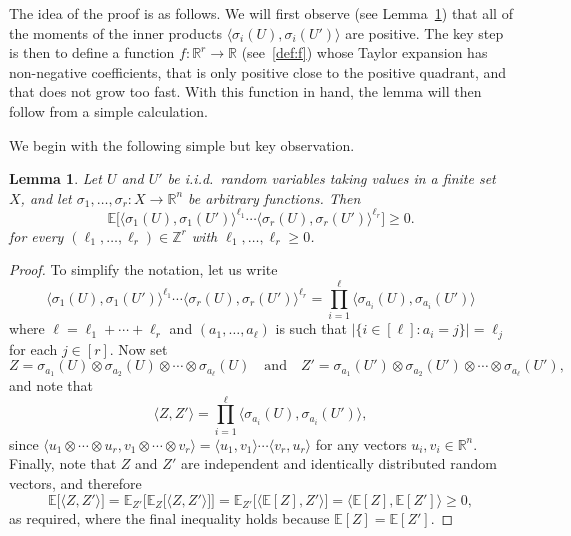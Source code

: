 \documentclass[12pt,reqno]{amsart}
\newtheorem{lemma}[theorem]{Lemma}
\theoremstyle{definition}
\theoremstyle{remark}
\newcommand\R{\mathbb{R}}
\newcommand\Z{\mathbb{Z}}
\newcommand\Ex{\mathbb{E}}
\renewcommand{\ge}{\geqslant}
\renewcommand{\to}{\rightarrow}
\def\R{\mathbb{R}}
\def\Z{\mathbb{Z}}
\begin{document}
The idea of the proof is as follows. We will first observe (see Lemma~\ref{lem:moments}) that all of the moments of the inner products \(\langle \sigma_i(U),\sigma_i(U') \rangle\) are positive. The key step is then to define a function \(f \colon \R^r \to \R\) (see~\eqref{def:f}) whose Taylor expansion has non-negative coefficients, that is only positive close to the positive quadrant, and that does not grow too fast. With this function in hand, the lemma will then follow from a simple calculation.

We begin with the following simple but key observation.

%
\begin{lemma}
	\label{lem:moments}
	Let \(U\) and\/ \(U'\) be i.i.d.~random variables taking values in a finite set~\(X\), and let\/ \(\sigma_1,\ldots,\sigma_r \colon X \to \R^n\) be arbitrary functions. Then
	\begin{equation*}
		\Ex\Big[ \big\langle \sigma_1(U),\sigma_1(U') \big\rangle^{\ell_1} \cdots \big\langle \sigma_r(U),\sigma_r(U') \big\rangle^{\ell_r} \Big] \ge 0.
	\end{equation*}
	for every \((\ell_1,\dots,\ell_r) \in \Z^r\) with \(\ell_1,\dots,\ell_r \ge 0\).
\end{lemma}
%
\begin{proof}
	To simplify the notation, let us write
	\begin{equation*}
		\big\langle \sigma_1(U),\sigma_1(U') \big\rangle^{\ell_1} \cdots \big\langle \sigma_r(U), \sigma_r(U') \big\rangle^{\ell_r} = \prod_{i = 1}^\ell \big\langle \sigma_{a_i}(U), \sigma_{a_i}(U') \big\rangle
	\end{equation*}
	where \(\ell = \ell_1 + \cdots + \ell_r\) and \((a_1,\dots,a_\ell)\) is such that \(\big| \big\{ i \in [\ell] : a_i = j \big\} \big| = \ell_j\) for each \(j \in [r]\). Now set
	\begin{equation*}
		Z = \sigma_{a_1}(U) \otimes \sigma_{a_2}(U) \otimes \cdots \otimes \sigma_{a_\ell}(U) \quad \text{and} \quad Z' = \sigma_{a_1}(U') \otimes \sigma_{a_2}(U') \otimes \cdots \otimes \sigma_{a_\ell}(U'),
	\end{equation*}
	and note that
	\begin{equation*}
		\big\langle Z, Z' \big\rangle = \prod_{i = 1}^\ell \big\langle \sigma_{a_i}(U), \sigma_{a_i}(U') \big\rangle,
	\end{equation*}
	since \(\langle u_1 \otimes \cdots \otimes u_r, v_1 \otimes \cdots \otimes v_r \rangle = \langle u_1, v_1 \rangle  \cdots \langle v_r , u_r \rangle \) for any vectors \(u_i,v_i \in \R^n\). Finally, note that \(Z\) and \(Z'\) are independent and identically distributed random vectors, and therefore
	\begin{equation*}
		\Ex \big[ \langle Z, Z' \rangle \big] = \Ex_{Z'} \big[ \Ex_Z \big[ \langle Z, Z' \rangle \big] \big] =
		\Ex_{Z'} \big[ \big\langle \Ex[Z], Z' \big\rangle \big] = \big\langle \Ex[Z], \Ex[Z'] \big\rangle \ge 0,
	\end{equation*}
	as required, where the final inequality holds because \(\Ex[Z] = \Ex[Z']\).
\end{proof}
%
\end{document}
